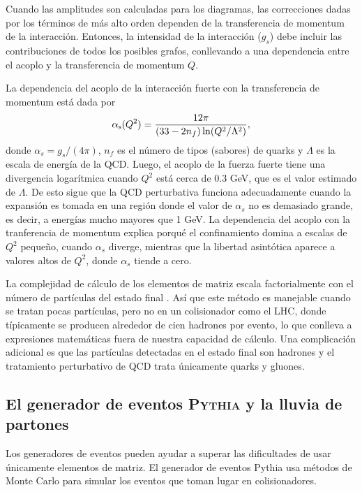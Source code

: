 \documentclass[a4paper,12pt]{article}
\begin{document}
Cuando las amplitudes son calculadas para los diagramas, las correcciones dadas por los términos de más alto orden dependen de la transferencia de momentum de la interacción. Entonces, la intensidad de la interacción ($g_s$) debe incluir las contribuciones de todos los posibles grafos, conllevando a una dependencia entre el acoplo y la transferencia de momentum $Q$.

La dependencia del acoplo de la interacción fuerte con la transferencia de momentum está dada por
\begin{equation}
\alpha_{\mathrm{s}}(Q^2) = \frac{12 \pi}{(33-2n_f)\ln(Q^2/\Lambda^2)},
\label{eq:alphastrong}
\end{equation}
donde $\alpha_s=g_s/(4\pi)$, $n_f$ es el número de tipos (sabores) de quarks y $\Lambda$ es la escala de energía de la QCD. Luego, el acoplo de la fuerza fuerte tiene una divergencia logarítmica cuando $Q^2$ está cerca de 0.3 GeV, que es el valor estimado de $\Lambda$. De esto sigue que la QCD perturbativa funciona adecuadamente cuando la expansión es tomada en una región donde el valor de $\alpha_s$ no es demasiado grande, es decir, a energías mucho mayores que 1 GeV. La dependencia del acoplo con la tranferencia de momentum explica porqué el confinamiento domina a escalas de $Q^2$ pequeño, cuando $\alpha_s$ diverge, mientras que la libertad asintótica aparece a valores altos de $Q^2$, donde $\alpha_s$ tiende a cero.

La complejidad de cálculo de los elementos de matriz escala factorialmente con el número de partículas del estado final \cite{Peskin:1995}. Así que este método es manejable cuando se tratan pocas partículas, pero no en un colisionador como el LHC, donde típicamente se producen alrededor de cien hadrones por evento, lo que conlleva a expresiones matemáticas fuera de nuestra capacidad de cálculo. Una complicación adicional es que las partículas detectadas en el estado final son hadrones y el tratamiento perturbativo de QCD trata únicamente quarks y gluones.

\subsection{El generador de eventos \textsc{Pythia} y la lluvia de partones}

Los generadores de eventos pueden ayudar a superar las dificultades de usar únicamente elementos de matriz. El generador de eventos Pythia usa métodos de Monte Carlo para simular los eventos que toman lugar en colisionadores.
\end{document}
